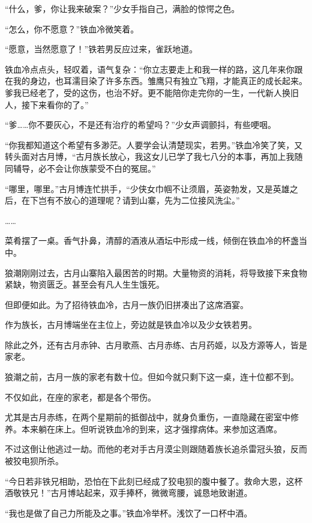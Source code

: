 
\begin{this_body}

“什么，爹，你让我来破案？”少女手指自己，满脸的惊愕之色。

“怎么，你不愿意？”铁血冷微笑着。

“愿意，当然愿意了！”铁若男反应过来，雀跃地道。

铁血冷点点头，轻叹着，语气复杂：“你立志要走上和我一样的路，这几年来你跟在我的身边，也耳濡目染了许多东西。雏鹰只有独立飞翔，才能真正的成长起来。爹我已经老了，受的这伤，也治不好。更不能陪你走完你的一生，一代新人换旧人，接下来看你的了。”

“爹……你不要灰心，不是还有治疗的希望吗？”少女声调颤抖，有些哽咽。

“你我都知道这个希望有多渺茫。人要学会认清楚现实，若男。”铁血冷笑了笑，又转头面对古月博，“古月族长放心，我这女儿已学了我七八分的本事，再加上我随同辅导，必不会让你族蒙受不白的冤屈。”

“哪里，哪里。”古月博连忙拱手，“少侠女巾帼不让须眉，英姿勃发，又是英雄之后，在下岂有不放心的道理呢？请到山寨，先为二位接风洗尘。”

……

菜肴摆了一桌。香气扑鼻，清醇的酒液从酒坛中形成一线，倾倒在铁血冷的杯盏当中。

狼潮刚刚过去，古月山寨陷入最困苦的时期。大量物资的消耗，将导致接下来食物紧缺，物资匮乏。甚至会有凡人生生饿死。

但即便如此。为了招待铁血冷，古月一族仍旧拼凑出了这席酒宴。

作为族长，古月博端坐在主位上，旁边就是铁血冷以及少女铁若男。

除此之外，还有古月赤钟、古月歌燕、古月赤练、古月药姬，以及方源等人，皆是家老。

狼潮之前，古月一族的家老有数十位。但如今就只剩下这一桌，连十位都不到。

不仅如此，在座的家老，都是各个带伤。

尤其是古月赤练，在两个星期前的抵御战中，就身负重伤，一直隐藏在密室中修养。本来躺在床上。但听说铁血冷的到来，这才强撑病体。来参加这酒席。

不过这倒让他逃过一劫。而他的老对手古月漠尘则跟随着族长追杀雷冠头狼，反而被狡电狈所杀。

“今日若非铁兄相助，恐怕在下此刻已经成了狡电狈的腹中餐了。救命大恩，这杯酒敬铁兄！”古月博站起来，双手捧杯，微微弯腰，诚恳地致谢道。

“我也是做了自己力所能及之事。”铁血冷举杯。浅饮了一口杯中酒。


\end{this_body}
